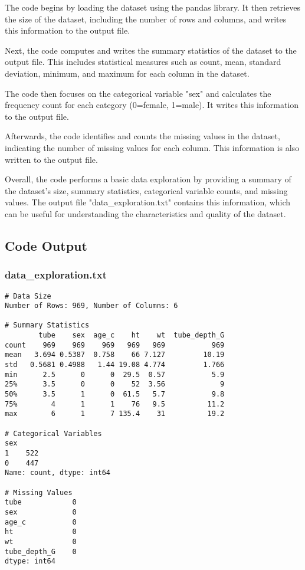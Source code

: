 \documentclass[11pt]{article}
\begin{document}
The code begins by loading the dataset using the pandas library. It then retrieves the size of the dataset, including the number of rows and columns, and writes this information to the output file.

Next, the code computes and writes the summary statistics of the dataset to the output file. This includes statistical measures such as count, mean, standard deviation, minimum, and maximum for each column in the dataset.

The code then focuses on the categorical variable "sex" and calculates the frequency count for each category (0=female, 1=male). It writes this information to the output file.

Afterwards, the code identifies and counts the missing values in the dataset, indicating the number of missing values for each column. This information is also written to the output file.

Overall, the code performs a basic data exploration by providing a summary of the dataset's size, summary statistics, categorical variable counts, and missing values. The output file "data\_exploration.txt" contains this information, which can be useful for understanding the characteristics and quality of the dataset.

\subsection{Code Output}

\subsubsection*{data\_exploration.txt}

\begin{Verbatim}[tabsize=4]
# Data Size
Number of Rows: 969, Number of Columns: 6

# Summary Statistics
        tube    sex  age_c    ht    wt  tube_depth_G
count    969    969    969   969   969           969
mean   3.694 0.5387  0.758    66 7.127         10.19
std   0.5681 0.4988   1.44 19.08 4.774         1.766
min      2.5      0      0  29.5  0.57           5.9
25%      3.5      0      0    52  3.56             9
50%      3.5      1      0  61.5   5.7           9.8
75%        4      1      1    76   9.5          11.2
max        6      1      7 135.4    31          19.2

# Categorical Variables
sex
1    522
0    447
Name: count, dtype: int64

# Missing Values
tube            0
sex             0
age_c           0
ht              0
wt              0
tube_depth_G    0
dtype: int64

\end{Verbatim}
\end{document}
